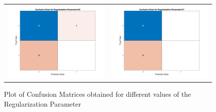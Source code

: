\documentclass[11pt]{article}
\begin{document}
\begin{figure}[H]
\begin{adjustbox}{width=0.8\paperwidth}
\begin{tabular}{c c}
			\includegraphics{Codes/Results/L1 Logistic Train/Conf_Chart_Reg_Par_0.6} & \includegraphics{Codes/Results/L1 Logistic Train/Conf_Chart_Reg_Par_0.7}\\
		\end{tabular}
	\end{adjustbox}
	\caption{Plot of Confusion Matrices obtained for different values of the Regularization Parameter}
	\label{fig:log_l1_reg_Confusion_Mat}
\end{figure}
\end{document}

